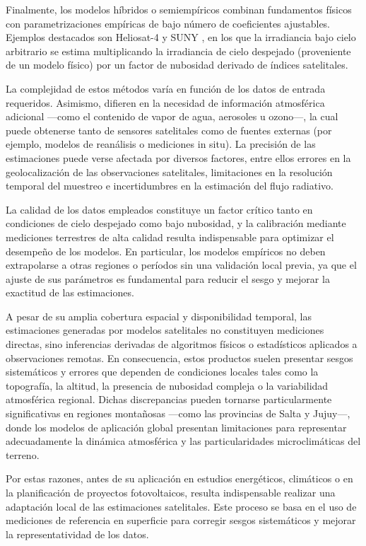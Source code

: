 Finalmente, los modelos híbridos o semiempíricos combinan fundamentos físicos con parametrizaciones empíricas de bajo número de coeficientes ajustables. Ejemplos destacados son Heliosat-4 \cite{qu2017} y SUNY \cite{Perez2002}, en los que la irradiancia bajo cielo arbitrario se estima multiplicando la irradiancia de cielo despejado (proveniente de un modelo físico) por un factor de nubosidad derivado de índices satelitales.

La complejidad de estos métodos varía en función de los datos de entrada requeridos. Asimismo, difieren en la necesidad de información atmosférica adicional —como el contenido de vapor de agua, aerosoles u ozono—, la cual puede obtenerse tanto de sensores satelitales como de fuentes externas (por ejemplo, modelos de reanálisis o mediciones in situ). La precisión de las estimaciones puede verse afectada por diversos factores, entre ellos errores en la geolocalización de las observaciones satelitales, limitaciones en la resolución temporal del muestreo e incertidumbres en la estimación del flujo radiativo. 

La calidad de los datos empleados constituye un factor crítico tanto en condiciones de cielo despejado como bajo nubosidad, y la calibración mediante mediciones terrestres de alta calidad resulta indispensable para optimizar el desempeño de los modelos. En particular, los modelos empíricos no deben extrapolarse a otras regiones o períodos sin una validación local previa, ya que el ajuste de sus parámetros es fundamental para reducir el sesgo y mejorar la exactitud de las estimaciones.

A pesar de su amplia cobertura espacial y disponibilidad temporal, las estimaciones generadas por modelos satelitales no constituyen mediciones directas, sino inferencias derivadas de algoritmos físicos o estadísticos aplicados a observaciones remotas. En consecuencia, estos productos suelen presentar sesgos sistemáticos y errores que dependen de condiciones locales tales como la topografía, la altitud, la presencia de nubosidad compleja o la variabilidad atmosférica regional. Dichas discrepancias pueden tornarse particularmente significativas en regiones montañosas —como las provincias de Salta y Jujuy—, donde los modelos de aplicación global presentan limitaciones para representar adecuadamente la dinámica atmosférica y las particularidades microclimáticas del terreno.

Por estas razones, antes de su aplicación en estudios energéticos, climáticos o en la planificación de proyectos fotovoltaicos, resulta indispensable realizar una adaptación local de las estimaciones satelitales. Este proceso se basa en el uso de mediciones de referencia en superficie para corregir sesgos sistemáticos y mejorar la representatividad de los datos.

